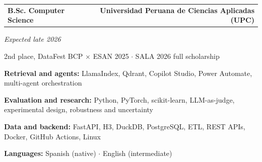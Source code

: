 \documentclass[10pt,a4paper]{article}
\begin{document}
\begin{tabular*}{\textwidth}{@{\extracolsep{\fill}}lr}
  \textbf{B.Sc. Computer Science} & \textbf{Universidad Peruana de Ciencias Aplicadas (UPC)}
\end{tabular*}\par
\textit{Expected late 2026}\par
2nd place, DataFest BCP $\times$ ESAN 2025 $\cdot$ SALA 2026 full scholarship

\textbf{Retrieval and agents:} LlamaIndex, Qdrant, Copilot Studio, Power Automate, multi-agent orchestration\par
\textbf{Evaluation and research:} Python, PyTorch, scikit-learn, LLM-as-judge, experimental design, robustness and uncertainty\par
\textbf{Data and backend:} FastAPI, H3, DuckDB, PostgreSQL, ETL, REST APIs, Docker, GitHub Actions, Linux\par
\textbf{Languages:} Spanish (native) $\cdot$ English (intermediate)
\end{document}
